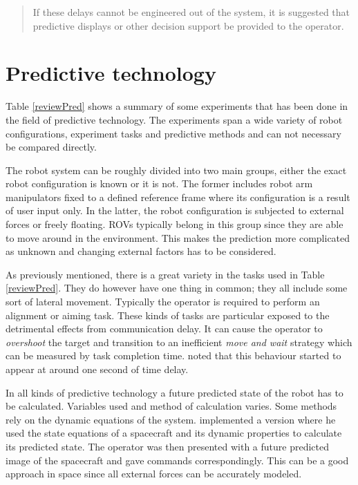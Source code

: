 \begin{quote}
\small If these delays cannot be engineered out of the system, it is suggested that predictive displays or other decision support be provided to the operator.
\end{quote}


\section{Predictive technology}



Table \ref{reviewPred} shows a summary of some experiments that has been done in the field of predictive technology. The experiments span a wide variety of robot configurations, experiment tasks and predictive methods and can not necessary be compared directly.

The robot system can be roughly divided into two main groups, either the exact robot configuration is known or it is not. The former includes robot arm manipulators fixed to a defined reference frame where its configuration is a result of user input only. In the latter, the robot configuration is subjected to external forces or freely floating. ROVs typically belong in this group since they are able to move around in the environment. This makes the prediction more complicated as unknown and changing external factors has to be considered.

As previously mentioned, there is a great variety in the tasks used in Table \ref{reviewPred}. They do however have one thing in common; they all include some sort of lateral movement. Typically the operator is required to perform an alignment or aiming task. These kinds of tasks are particular exposed to the detrimental effects from communication delay. It can cause the operator to \emph{overshoot} the target and transition to an inefficient \emph{move and wait} strategy which can be measured by task completion time. \citet{Lane2002} noted that this behaviour started to appear at around one second of time delay.

In all kinds of predictive technology a future predicted state of the robot has to be calculated. Variables used and method of calculation varies. Some methods rely on the dynamic equations of the system. \citet{Zhang2017} implemented a version where he used the state equations of a spacecraft and its dynamic properties to calculate its predicted state. The operator was then presented with a future predicted image of the spacecraft and gave commands correspondingly. This can be a good approach in space since all external forces can be accurately modeled.

